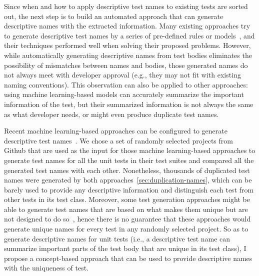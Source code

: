 Since when and how to apply descriptive test names to existing tests are sorted out, the next step is to build an automated approach that can generate descriptive names with the extracted information.
%
Many existing approaches try to generate descriptive test names by a series of pre-defined rules or models~\cite{arcuri2014automated, zhang2015automatically, allamanis2015suggesting, daka2017generating, li2019deepfl}, and their techniques performed well when solving their proposed problems.
%
However, while automatically generating descriptive names from test bodies eliminates the possibility of mismatches between names and bodies, those generated names do not always meet with developer approval (e.g., they may not fit with existing naming conventions).
%
This observation can also be applied to other approaches: using machine learning-based models can accurately summarize the important information of the test, but their summarized information is not always the same as what developer needs, or might even produce duplicate test names.


Recent machine learning-based approaches can be configured to generate descriptive test names~\cite{alon2018code2seq,alon2019code2vec}.
%
We chose a set of randomly selected projects from Github that are used as the input for those machine learning-based approaches to generate test names for all the unit tests in their test suites and compared all the generated test names with each other.
%
Nonetheless, thousands of duplicated test names were generated by both approaches~\cref{sec:duplication-names}, which can be barely used to provide any descriptive information and distinguish each test from other tests in its test class.
Moreover, some test generation approaches might be able to generate test names that are based on what makes them unique but are not designed to do so~\cite{arcuri2014automated,zhang2015automatically,allamanis2015suggesting,daka2017generating}, hence there is no guarantee that these approaches would generate unique names for every test in any randomly selected project.
So as to generate descriptive names for unit tests (i.e., a descriptive test name can summarize important parts of the test body that are unique in its test class), I propose a concept-based approach that can be used to provide descriptive names with the uniqueness of test.


